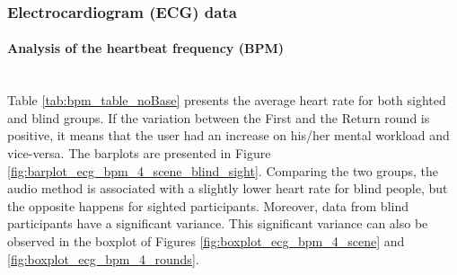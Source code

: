 \subsubsection{Electrocardiogram (ECG) data}
\label{subsubsec:results_ecg_2}

\paragraph{Analysis of the heartbeat frequency (BPM)}\mbox{}\\

Table \ref{tab:bpm_table_noBase} presents the average heart rate for both sighted and blind groups. If the variation between the First and the Return round is positive, it means that the user had an increase on his/her mental workload and vice-versa. The barplots are presented in Figure \ref{fig:barplot_ecg_bpm_4_scene_blind_sight}. Comparing the two groups, the audio method is associated with a slightly lower heart rate for blind people, but the opposite happens for sighted participants. Moreover, data from blind participants have a significant variance. This significant variance can also be observed in the boxplot of Figures \ref{fig:boxplot_ecg_bpm_4_scene} and \ref{fig:boxplot_ecg_bpm_4_rounds}. 



